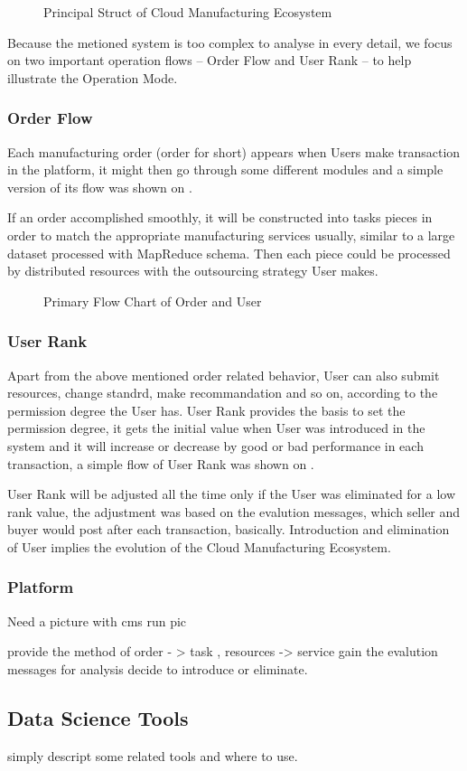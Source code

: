 \begin{figure}[!h]
\centering
\caption{Principal Struct of Cloud Manufacturing Ecosystem}
\label{fig:platformstruct}
\end{figure}

Because the metioned system is too complex to analyse in every detail, we focus on two important operation flows -- Order Flow and User Rank -- to help illustrate the Operation Mode. 

\subsubsection{Order Flow}
Each manufacturing order (order for short) appears when Users make transaction in the platform, it might then go through some different modules and a simple version of its flow was shown on .

If an order accomplished smoothly, it will be constructed into tasks pieces in order to match the appropriate manufacturing services usually, similar to a large dataset processed with MapReduce\cite{Dean2008} schema. Then each piece could be processed by distributed resources with the outsourcing strategy User makes.

\begin{figure}[!h]
\centering\small
\caption{ Primary Flow Chart of Order and User}
\end{figure}
\subsubsection{User Rank}
Apart from the above mentioned order related behavior, User can also submit resources, change standrd, make recommandation and so on, according to the permission degree the User has. User Rank provides the basis to set the permission degree, it gets the initial value when User was introduced in the system and it will increase or decrease by good or bad performance in each transaction, a simple flow of User Rank was shown on .

User Rank will be adjusted all the time only if the User was eliminated for a low rank value, the adjustment was based on the evalution messages, which seller and buyer would post after each transaction, basically. Introduction and elimination of User implies the evolution of the Cloud Manufacturing Ecosystem. 

\subsubsection{Platform}
Need a picture with cms run pic

provide the method of order - > task , resources -> service
gain the evalution messages for analysis
decide to introduce or eliminate.

\subsection{Data Science Tools}


simply descript some related tools and where to use.
